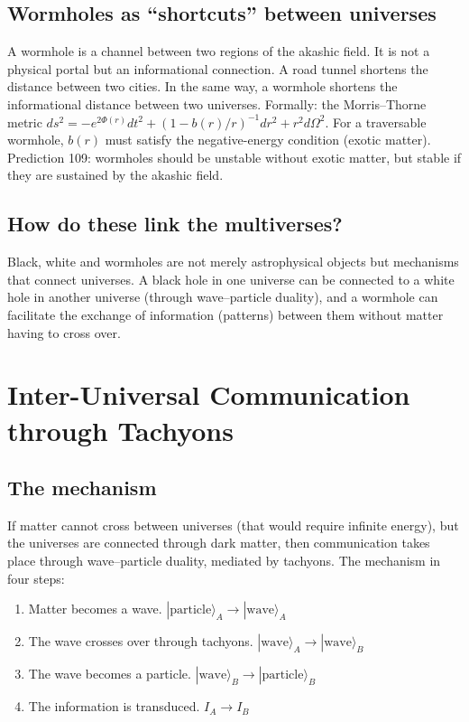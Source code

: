 \subsection{Wormholes as ``shortcuts'' between universes}
A wormhole is a channel between two regions of the akashic field. It is not a physical portal but an informational connection. A road tunnel shortens the distance between two cities. In the same way, a wormhole shortens the informational distance between two universes. Formally: the Morris--Thorne metric $ds^2 = -e^{2\Phi(r)}dt^2 + (1-b(r)/r)^{-1}dr^2 + r^2 d\Omega^2$. For a traversable wormhole, $b(r)$ must satisfy the negative-energy condition (exotic matter). Prediction 109: wormholes should be unstable without exotic matter, but stable if they are sustained by the akashic field.

\subsection{How do these link the multiverses?}
Black, white and wormholes are not merely astrophysical objects but mechanisms that connect universes. A black hole in one universe can be connected to a white hole in another universe (through wave--particle duality), and a wormhole can facilitate the exchange of information (patterns) between them without matter having to cross over.

\section{Inter-Universal Communication through Tachyons}
\subsection{The mechanism}
If matter cannot cross between universes (that would require infinite energy), but the universes are connected through dark matter, then communication takes place through wave--particle duality, mediated by tachyons. The mechanism in four steps:
\begin{enumerate}
    \item Matter becomes a wave. $|\text{particle}\rangle_A \to |\text{wave}\rangle_A$
    \item The wave crosses over through tachyons. $|\text{wave}\rangle_A \to |\text{wave}\rangle_B$
    \item The wave becomes a particle. $|\text{wave}\rangle_B \to |\text{particle}\rangle_B$
    \item The information is transduced. $I_A \to I_B$
\end{enumerate}

